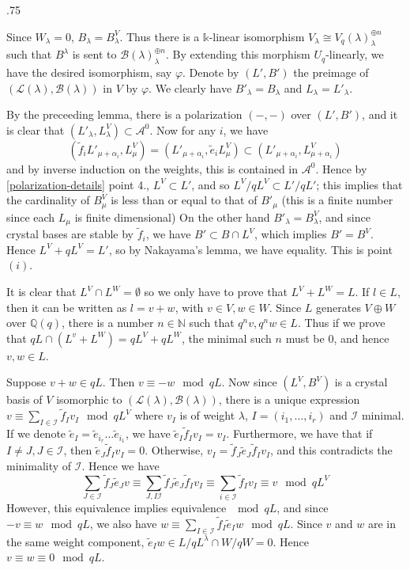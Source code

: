 \documentclass[11pt,fleqn]{article}
\makeatletter
\renewenvironment{proof}[1][\proofname]{\par
  \pushQED{\qed}%
  \normalfont \topsep.75\paraskip\relax
  \trivlist
  \item[\hskip\labelsep
        \itshape
    #1\@addpunct{.}]\ignorespaces
}{%
  \popQED\endtrivlist\@endpefalse
}
\newcommand\NN{\mathbb N}
\newcommand\QQ{\mathbb Q}
\renewcommand\phi{\varphi}
\newcommand\A{\mathcal A}
\newcommand\B{\mathcal B}
\renewcommand\L{\mathcal L}
\newcommand\kk{\mathds{k}}
\makeatother
\begin{document}
\begin{proof}
	Since $W_\lambda = 0$, $B_\lambda = B^{V}_\lambda$. Thus there is a $\kk$-linear
isomorphism $V_\lambda \cong V_q(\lambda)^{\oplus n}_\lambda$ such that $B^\lambda$ is sent 
to $\B(\lambda)^{\oplus n}_\lambda$. By extending this morphism $U_q$-linearly, we have
the desired isomorphism, say $\phi$. Denote by $(L',B')$ the preimage of $(\L(\lambda),
\B(\lambda))$ in $V$ by $\phi$. We clearly have $B'_\lambda = B_\lambda$
and $L_\lambda = L'_\lambda$. 

By the preceeding lemma, there is a polarization $(-,-)$ over $(L',B')$, and
it is clear that $(L'_\lambda,L^{V}_\lambda) \subset \A^0$. Now for any $i$, we have
$$ (\tilde f_i L'_{\mu + \alpha_i}, L^{V}_\mu) = (L'_{\mu+\alpha_i}, \tilde e_i
L^V_\mu) \subset (L'_{\mu + \alpha_i}, L^V_{\mu + \alpha_i}) $$
and by inverse induction on the weights, this is contained in $\A^0$. Hence by 
\ref{polarization-details} point 4., $L^V \subset L'$, and so $L^V / q L^V \subset L' / q L'$; 
this implies that the cardinality of $B^{V}_\mu$ is less than or equal to that of $B'_\mu$ 
(this is a finite number since each $L_\mu$ is finite dimensional) On the other hand 
$B'_\lambda = B^{V}_\lambda$, and  since crystal bases are stable by $\tilde f_i$, we have $B' 
\subset B \cap L^V$, which implies $B' = B^V$. Hence $L^V + q L^V =L'$, so by Nakayama's 
lemma, we have equality. This is point $(i)$.

It is clear that $L^V \cap L^W = \emptyset$ so we only have to prove that $L^V + L^W = L$. 
If $l \in L$, then it can be written as $l = v + w$, with $v \in V, w \in W$. Since $L$
generates $V\oplus W$ over $\QQ(q)$, there is a number $n \in \NN$ such that $q^nv, q^nw
\in L$. Thus if we prove that $qL \cap (L^v + L^W) = qL^V + qL^W$, the minimal such $n$
must be $0$, and hence $v,w \in L$.

Suppose $v+w \in qL$. Then $v \equiv -w \mod qL$. Now since $(L^V,B^V)$ is a crystal
basis of $V$ isomorphic to $(\L(\lambda),\B(\lambda))$, there is a unique expression 
$v \equiv \sum_{I \in \mathcal I} \tilde f_I v_I \mod qL^V$ where $v_I$ is 
of weight $\lambda$, $I = (i_1, \ldots, i_r)$ and $\mathcal I$ minimal. If we denote 
$\tilde e_I = \tilde e_{i_r} \ldots \tilde e_{i_1}$, we have $\tilde e_I \tilde f_I v_I
 = v_I$. Furthermore, we have that if $I \neq J, J \in \mathcal I$, then $\tilde e_J 
\tilde f_I v_I = 0$. Otherwise, $v_I = \tilde f_J \tilde e_J \tilde f_I v_I$, and this
contradicts the minimality of $\mathcal I$. Hence we have 
$$ \sum_{J \in \mathcal I} \tilde f_J \tilde e_J v \equiv \sum_{J, I \mathcal I} \tilde
f_J \tilde e_J \tilde f_I v_I \equiv \sum_{i \in \mathcal I} \tilde f_I v_I \equiv v \mod
qL^V $$
However, this equivalence implies equivalence $\mod qL$, and since $-v \equiv w \mod qL$,
we also have $w \equiv \sum_{I \in \mathcal I} \tilde f_I \tilde e_I w \mod qL$. Since $v$ 
and $w$ are in the same weight component, $\tilde e_I w \in L/qL^\lambda \cap W/qW = 0$. 
Hence $v \equiv w \equiv 0 \mod qL$.


\end{proof}
\end{document}
